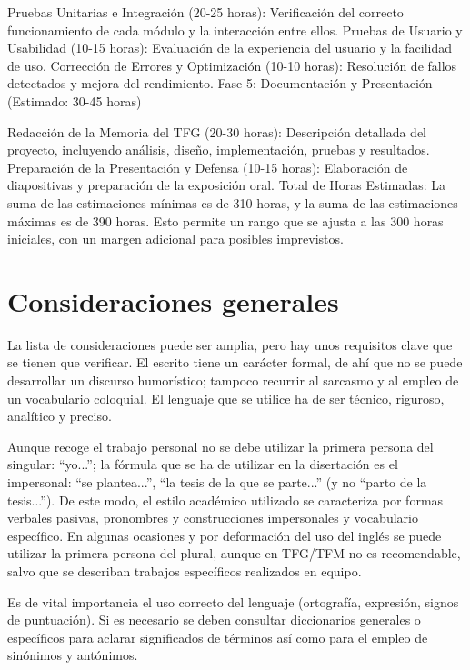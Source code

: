 Pruebas Unitarias e Integración (20-25 horas):
Verificación del correcto funcionamiento de cada módulo y la interacción entre ellos.
Pruebas de Usuario y Usabilidad (10-15 horas):
Evaluación de la experiencia del usuario y la facilidad de uso.
Corrección de Errores y Optimización (10-10 horas):
Resolución de fallos detectados y mejora del rendimiento.
Fase 5: Documentación y Presentación (Estimado: 30-45 horas)

Redacción de la Memoria del TFG (20-30 horas):
Descripción detallada del proyecto, incluyendo análisis, diseño, implementación, pruebas y resultados.
Preparación de la Presentación y Defensa (10-15 horas):
Elaboración de diapositivas y preparación de la exposición oral.
Total de Horas Estimadas: La suma de las estimaciones mínimas es de 310 horas, y la suma de las estimaciones máximas es de 390 horas. Esto permite un rango que se ajusta a las 300 horas iniciales, con un margen adicional para posibles imprevistos.


\chapter{Consideraciones generales} 
\label{sec:consideraciones}


La lista de consideraciones puede ser amplia, pero hay unos requisitos clave que se tienen que verificar.
El  escrito  tiene  un  carácter  formal,  de  ahí  que  no  se  puede  desarrollar  un  discurso  humorístico;  tampoco  recurrir  al  sarcasmo  y  al  empleo  de  un  vocabulario  coloquial.  El  lenguaje que se utilice ha de ser técnico, riguroso, analítico y preciso. 

Aunque recoge el trabajo personal no se debe utilizar la  primera  persona  del  singular:  “yo...”; la fórmula que se ha de utilizar en la disertación es el impersonal: “se plantea...”, “la  tesis  de  la  que  se  parte...”  (y  no  “parto  de  la  tesis...”).  De  este  modo,  el  estilo  académico   utilizado   se   caracteriza   por   formas   verbales   pasivas,   pronombres   y   construcciones impersonales y vocabulario específico. En algunas ocasiones y por deformación del uso del inglés se puede utilizar la primera persona del plural, aunque en TFG/TFM no es recomendable, salvo que se describan trabajos específicos realizados en equipo.

Es de vital importancia el uso correcto del lenguaje (ortografía, expresión, signos de puntuación).  Si es necesario se deben consultar diccionarios generales o específicos para aclarar significados de términos así como para el empleo de sinónimos y antónimos. 

